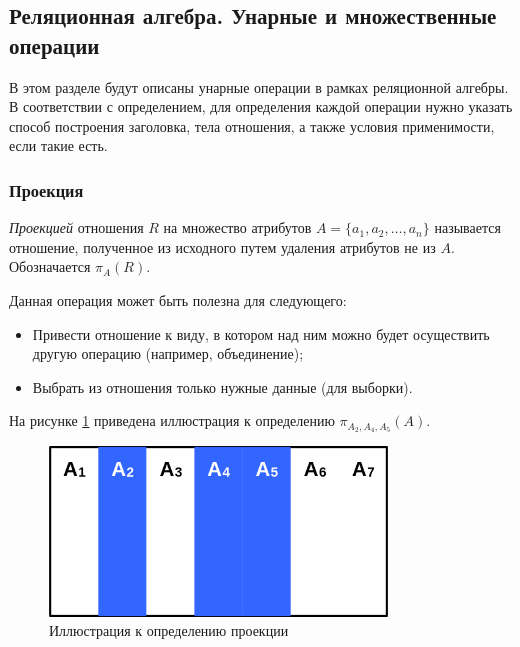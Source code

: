 \subsection{Реляционная алгебра. Унарные и множественные операции}

В этом разделе будут описаны унарные операции в рамках реляционной алгебры. В соответствии с определением, для определения каждой операции нужно указать способ построения заголовка, тела отношения, а также условия применимости, если такие есть.

\subsubsection{Проекция}

\begin{definition}
	\textit{Проекцией} отношения $R$ на множество атрибутов
	$A = \{ a_1, a_2, \ldots, a_n \}$ называется отношение, полученное из исходного путем
	удаления атрибутов не из $A$. Обозначается $\pi_A(R)$.
\end{definition}

Данная операция может быть полезна для следующего:
\begin{itemize}
	\item Привести отношение к виду, в котором над ним можно будет осуществить другую операцию (например, объединение);
	\item Выбрать из отношения только нужные данные (для выборки).
\end{itemize}

На рисунке \ref{proj-def} приведена иллюстрация к определению $\pi_{A_2, A_4, A_5}(A)$.

\begin{figure}[h]
	\centering

	\includegraphics[width=0.8\textwidth]{../assets/kgeorgiy/relalgebra/Primitive_Projection_0.svg.png}
	\caption{Иллюстрация к определению проекции}
	\label{proj-def}
\end{figure}

